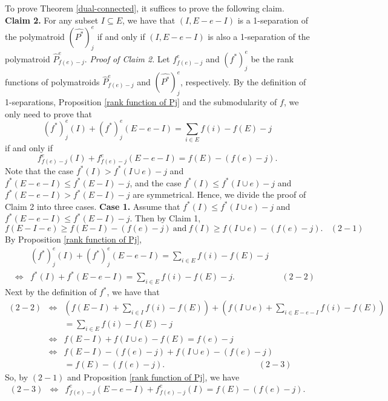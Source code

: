 \documentclass[preprint,10pt]{elsarticle}
\theoremstyle{plain}
\theoremstyle{definition}
\theoremstyle{remark}
\begin{document}
To prove Theorem \ref{dual-connected}, it suffices to prove the following claim.
\vskip0.2cm
\noindent\textbf{Claim 2.} For any subset $I\subseteq E$, we have that $(I,E-e-I)$ is a 1-separation of the polymatroid $(\widehat{P^*})_{j}^{e}$ if and only if $(I,E-e-I)$ is also a 1-separation of the polymatroid $\widehat{P}^{e}_{f(e)-j}$.
\vskip0.1cm
\noindent\emph{Proof of Claim 2.} Let $f_{f(e)-j}^{e}$ and $(f^*)_{j}^{e}$ be the rank functions of polymatroids $\widehat{P}_{f(e)-j}^{e}$ and $(\widehat{P^*})_{j}^{e}$, respectively. By the definition of 1-separations, Proposition \ref{rank function of Pj} and the submodularity of $f$, we only need to prove that
 $$(f^*)_{j}^{e}(I) + (f^*)_{j}^{e}(E-e-I)= \sum_{i \in E} f(i) - f(E)-j$$ if and only if $$f_{f(e)-j}^{e}(I) + f_{f(e)-j}^{e}(E-e-I)= f(E)-(f(e)-j).$$
Note that the case \(f^*(I) > f^*(I\cup e)-j\) and \(f^*(E-e-I) \leq f^*(E-I)-j\), and the case \(f^*(I) \leq f^*(I\cup e)-j\) and \(f^*(E-e-I) > f^*(E-I)-j\) are symmetrical. Hence, we divide the proof of Claim 2 into three cases.
\vskip0.2cm
\noindent \textbf{Case 1.} Assume that \(f^*(I) \leq f^*(I\cup e)-j\) and \(f^*(E-e-I) \leq f^*(E-I)-j\). Then by Claim 1,
$$f(E-I-e)\geq f(E-I) -(f(e) -j) ~\text{and} ~f(I) \geq f(I\cup e)-(f(e) -j).~~~~(2-1)$$
 By Proposition \ref{rank function of Pj},
 \begin{eqnarray*}
&&(f^*)_{j}^{e}(I) + (f^*)_{j}^{e}(E-e-I)= \sum_{i \in E} f(i) - f(E)-j \\
& \Leftrightarrow & f^*(I) + f^*(E-e-I)= \sum_{i \in E} f(i) - f(E)-j. ~~~~~~~~~~~~~~~~~~~~~~~~~(2-2)
  \end{eqnarray*}
 Next by the definition of $f^*$, we have that
 \begin{eqnarray*}
(2-2) & \Leftrightarrow &\left(f(E-I) + \sum_{i \in I} f(i) - f(E)\right)  +\left( f(I\cup e) + \sum_{i \in E-e-I} f(i) - f(E)\right)\\
 & &=\sum_{i \in E} f(i) - f(E)-j\\
 & \Leftrightarrow &f(E-I) + f(I\cup e) - f(E)=  f(e)-j\\
 & \Leftrightarrow &f(E-I)-(f(e)-j) + f(I\cup e) -(f(e)-j)\\
 & & =f(E)-(f(e)-j).     ~~~~~~~~~~~~~~~~~~~~~~~~~~~~~~~~~~~~~~~~~~~~~~~~~~(2-3)
  \end{eqnarray*}
So, by  $(2-1)$ and Proposition \ref{rank function of Pj}, we have
\begin{eqnarray*}
(2-3) & \Leftrightarrow &f_{f(e)-j}^{e}(E-e-I) +f_{f(e)-j}^{e}(I)= f(E)-(f(e)-j).
  \end{eqnarray*}
\end{document}
